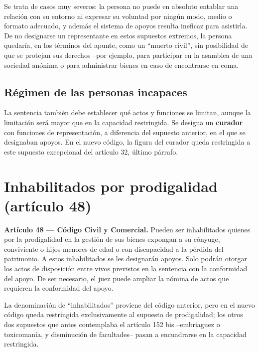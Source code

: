 \documentclass[12pt,oneside]{book}
\begin{document}

Se trata de casos muy severos: la persona no puede en absoluto entablar una relación con su entorno ni expresar su voluntad por ningún modo, medio o formato adecuado, y además el sistema de apoyos resulta ineficaz para asistirla. De no designarse un representante en estos supuestos extremos, la persona quedaría, en los términos del apunte, como un ``muerto civil'', sin posibilidad de que se protejan sus derechos --por ejemplo, para participar en la asamblea de una sociedad anónima o para administrar bienes en caso de encontrarse en coma.

\subsection{Régimen de las personas incapaces}

La sentencia también debe establecer qué actos y funciones se limitan, aunque la limitación será mayor que en la capacidad restringida. Se designa un \textbf{curador} con funciones de representación, a diferencia del supuesto anterior, en el que se designaban apoyos. En el nuevo código, la figura del curador queda restringida a este supuesto excepcional del artículo 32, último párrafo.

\section{Inhabilitados por prodigalidad (artículo 48)}

\begin{important}
\textbf{Artículo 48 --- Código Civil y Comercial.} Pueden ser inhabilitados quienes por la prodigalidad en la gestión de sus bienes expongan a su cónyuge, conviviente o hijos menores de edad o con discapacidad a la pérdida del patrimonio. A estos inhabilitados se les designarán apoyos. Solo podrán otorgar los actos de disposición entre vivos previstos en la sentencia con la conformidad del apoyo. De ser necesario, el juez puede ampliar la nómina de actos que requieren la conformidad del apoyo.
\end{important}

La denominación de ``inhabilitados'' proviene del código anterior, pero en el nuevo código queda restringida exclusivamente al supuesto de prodigalidad; los otros dos supuestos que antes contemplaba el artículo 152 bis --embriaguez o toxicomanía, y disminución de facultades-- pasan a encuadrarse en la capacidad restringida.
\end{document}
